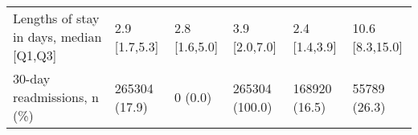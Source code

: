 \begin{adjustbox}{width={\textwidth},totalheight={\textheight},keepaspectratio,frame}
{\begin{tabular}{L{20em}C{10em}C{10em}C{10em}C{10em}C{10em}}
\hspace{3mm}    Lengths of stay in days, median [Q1,Q3] &      2.9 [1.7,5.3] &                 2.8 [1.6,5.0] &             3.9 [2.0,7.0] &                  2.4 [1.4,3.9] &           10.6 [8.3,15.0] \\
\hspace{3mm}                30-day readmissions, n (\%) &      265304 (17.9) &                       0 (0.0) &            265304 (100.0) &                  168920 (16.5) &              55789 (26.3) \\
\end{tabular}
\label{table:table1}
}
\end{adjustbox}
% 





